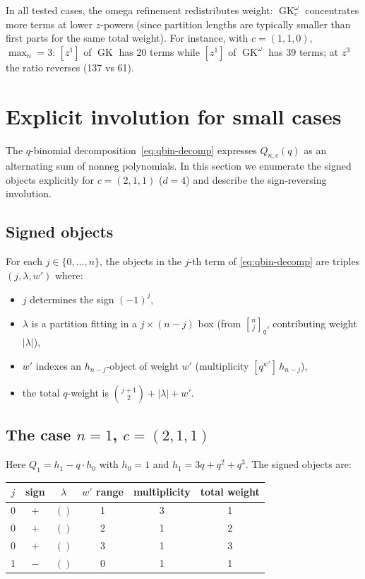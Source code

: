 \documentclass[11pt]{article}
\newcommand{\GK}{\operatorname{GK}}
\newcommand{\qbin}[2]{\genfrac{[}{]}{0pt}{}{#1}{#2}}
\begin{document}
In all tested cases, the omega refinement redistributes weight: $\GK_c^\omega$
concentrates more terms at lower $z$-powers (since partition lengths are typically
smaller than first parts for the same total weight). For instance, with $c=(1,1,0)$,
$\max_n=3$: $[z^1]$ of $\GK$ has 20 terms while $[z^1]$ of $\GK^\omega$ has 39
terms; at $z^3$ the ratio reverses (137 vs 61).


\section{Explicit involution for small cases}
\label{sec:explicit-involution}

The $q$-binomial decomposition~\eqref{eq:qbin-decomp} expresses $Q_{n,c}(q)$ as
an alternating sum of nonneg polynomials. In this section we enumerate the signed
objects explicitly for $c = (2,1,1)$ ($d = 4$) and describe the sign-reversing
involution.

\subsection{Signed objects}

For each $j \in \{0, \ldots, n\}$, the objects in the $j$-th term of
\eqref{eq:qbin-decomp} are triples $(j, \lambda, w')$ where:
\begin{itemize}
  \item $j$ determines the sign $(-1)^j$,
  \item $\lambda$ is a partition fitting in a $j \times (n-j)$ box
    (from $\qbin{n}{j}_q$, contributing weight $|\lambda|$),
  \item $w'$ indexes an $h_{n-j}$-object of weight $w'$
    (multiplicity $[q^{w'}]\, h_{n-j}$),
  \item the total $q$-weight is $\binom{j+1}{2} + |\lambda| + w'$.
\end{itemize}

\subsection{The case $n = 1$, $c = (2,1,1)$}

Here $Q_1 = h_1 - q \cdot h_0$ with $h_0 = 1$ and
$h_1 = 3q + q^2 + q^3$. The signed objects are:

\begin{center}
\begin{tabular}{c|c|c|c|c|c}
$j$ & sign & $\lambda$ & $w'$ range & multiplicity & total weight \\
\hline
0 & $+$ & $()$ & 1 & 3 & 1 \\
0 & $+$ & $()$ & 2 & 1 & 2 \\
0 & $+$ & $()$ & 3 & 1 & 3 \\
1 & $-$ & $()$ & 0 & 1 & 1 \\
\end{tabular}
\end{center}
\end{document}
